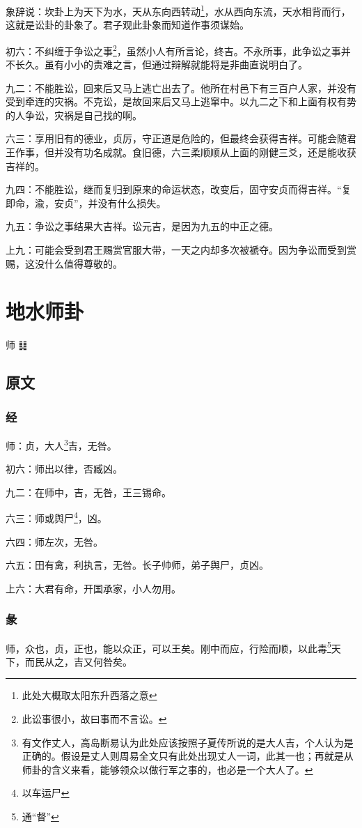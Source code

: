 \documentclass[12pt,oneside]{book}
\begin{document}
象辞说：坎卦上为天下为水，天从东向西转动\footnote{此处大概取太阳东升西落之意}，水从西向东流，天水相背而行，这就是讼卦的卦象了。君子观此卦象而知道作事须谋始。

初六：不纠缠于争讼之事\footnote{此讼事很小，故曰事而不言讼。}，虽然小人有所言论，终吉。不永所事，此争讼之事并不长久。虽有小小的责难之言，但通过辩解就能将是非曲直说明白了。

九二：不能胜讼，回来后又马上逃亡出去了。他所在村邑下有三百户人家，并没有受到牵连的灾祸。不克讼，是故回来后又马上逃窜中。以九二之下和上面有权有势的人争讼，灾祸是自己找的啊。

六三：享用旧有的德业，贞厉，守正道是危险的，但最终会获得吉祥。可能会随君王作事，但并没有功名成就。食旧德，六三柔顺顺从上面的刚健三爻，还是能收获吉祥的。

九四：不能胜讼，继而复归到原来的命运状态，改变后，固守安贞而得吉祥。“复即命，渝，安贞”，并没有什么损失。

九五：争讼之事结果大吉祥。讼元吉，是因为九五的中正之德。

上九：可能会受到君王赐赏官服大带，一天之内却多次被褫夺。因为争讼而受到赏赐，这没什么值得尊敬的。



\chapter{地水师卦}
师 {\Large ䷆}

\section{原文}
\subsection{经}
师：贞，大人\footnote{有文作丈人，高岛断易认为此处应该按照子夏传所说的是大人吉，个人认为是正确的。假设是丈人则周易全文只有此处出现丈人一词，此其一也；再就是从师卦的含义来看，能够领众以做行军之事的，也必是一个大人了。}吉，无咎。

初六：师出以律，否臧凶。

九二：在师中，吉，无咎，王三锡命。

六三：师或舆尸\footnote{以车运尸}，凶。

六四：师左次，无咎。

六五：田有禽，利执言，无咎。长子帅师，弟子舆尸，贞凶。

上六：大君有命，开国承家，小人勿用。

\subsection{彖}
师，众也，贞，正也，能以众正，可以王矣。刚中而应，行险而顺，以此毒\footnote{通“督”}天下，而民从之，吉又何咎矣。
\end{document}
